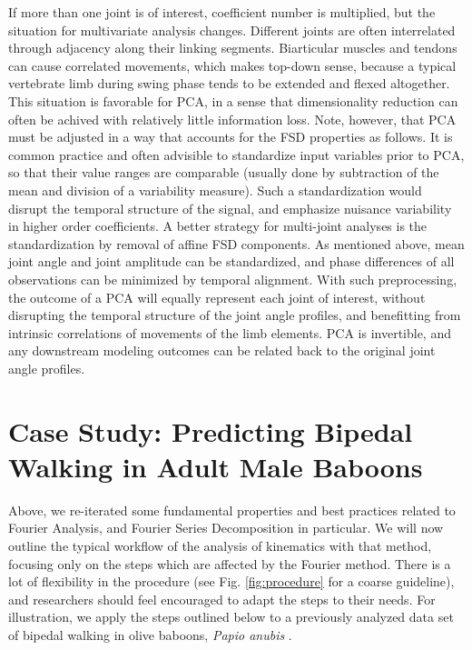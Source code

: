 \documentclass[10pt,a4paper]{article}
\begin{document}
If more than one joint is of interest, coefficient number is multiplied, but the situation for multivariate analysis changes.
Different joints are often interrelated through adjacency along their linking segments.
Biarticular muscles and tendons can cause correlated movements, which makes top-down sense, because a typical vertebrate limb during swing phase tends to be extended and flexed altogether.
This situation is favorable for PCA, in a sense that dimensionality reduction can often be achived with relatively little information loss.
Note, however, that PCA must be adjusted in a way that accounts for the FSD properties as follows.
It is common practice and often advisible to standardize input variables prior to PCA, so that their value ranges are comparable (usually done by subtraction of the mean and division of a variability measure).
Such a standardization would disrupt the temporal structure of the signal, and emphasize nuisance variability in higher order coefficients.
A better strategy for multi-joint analyses is the standardization by removal of affine FSD components.
As mentioned above, mean joint angle and joint amplitude can be standardized, and phase differences of all observations can be minimized by temporal alignment.
With such preprocessing, the outcome of a PCA will equally represent each joint of interest, without disrupting the temporal structure of the joint angle profiles, and benefitting from intrinsic correlations of movements of the limb elements.
PCA is invertible, and any downstream modeling outcomes can be related back to the original joint angle profiles.

\FloatBarrier\clearpage
\section{Case Study: Predicting Bipedal Walking in Adult Male Baboons}
\label{casestudy}
Above, we re-iterated some fundamental properties and best practices related to Fourier Analysis, and Fourier Series Decomposition in particular.
We will now outline the typical workflow of the analysis of kinematics with that method, focusing only on the steps which are affected by the Fourier method.
There is a lot of flexibility in the procedure (see Fig. \ref{fig:procedure} for a coarse guideline), and researchers should feel encouraged to adapt the steps to their needs.
For illustration, we apply the steps outlined below to a previously analyzed data set of bipedal walking in olive baboons, \emph{Papio anubis} \citep{Druelle2021}.
\end{document}
